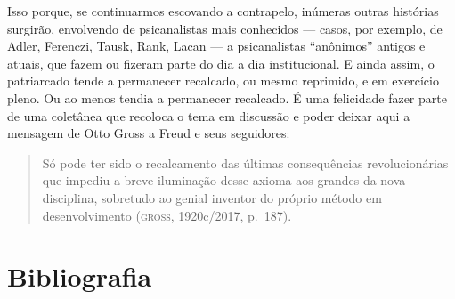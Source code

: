 Isso porque, se continuarmos escovando a contrapelo, inúmeras outras
histórias surgirão, envolvendo de psicanalistas mais conhecidos ---
casos, por exemplo, de Adler, Ferenczi, Tausk, Rank, Lacan --- a
psicanalistas ``anônimos'' antigos e atuais, que fazem ou fizeram parte
do dia a dia institucional. E ainda assim, o patriarcado tende a
permanecer recalcado, ou mesmo reprimido, e em exercício pleno. Ou ao
menos tendia a permanecer recalcado. É uma felicidade fazer parte de uma
coletânea que recoloca o tema em discussão e poder deixar aqui a
mensagem de Otto Gross a Freud e seus seguidores:

\begin{quote}
Só pode ter sido o recalcamento das últimas consequências
revolucionárias que impediu a breve iluminação desse axioma aos grandes
da nova disciplina, sobretudo ao genial inventor do próprio método em
desenvolvimento (\textsc{gross}, 1920c/2017, p.~187).
\end{quote}

\section{Bibliografia}

